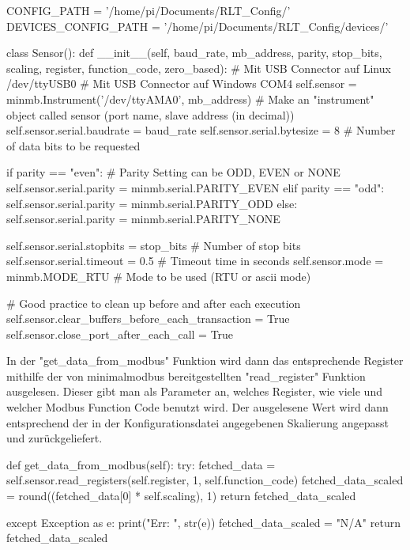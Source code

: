 \begin{pythoncode}
CONFIG_PATH = '/home/pi/Documents/RLT_Config/'
DEVICES_CONFIG_PATH = '/home/pi/Documents/RLT_Config/devices/'

class Sensor():
	def __init__(self, baud_rate, mb_address, parity, stop_bits, scaling, register, function_code, zero_based):
		# Mit USB Connector auf Linux       /dev/ttyUSB0
		# Mit USB Connector auf Windows     COM4
		self.sensor = minmb.Instrument('/dev/ttyAMA0',
		mb_address)  # Make an "instrument" object called sensor (port name, slave address (in decimal))
		self.sensor.serial.baudrate = baud_rate
		self.sensor.serial.bytesize = 8  # Number of data bits to be requested
		
		if parity == "even":  # Parity Setting can be ODD, EVEN or NONE
			self.sensor.serial.parity = minmb.serial.PARITY_EVEN
		elif parity == "odd":
			self.sensor.serial.parity = minmb.serial.PARITY_ODD
		else:
			self.sensor.serial.parity = minmb.serial.PARITY_NONE
		
		self.sensor.serial.stopbits = stop_bits  # Number of stop bits
		self.sensor.serial.timeout = 0.5  # Timeout time in seconds
		self.sensor.mode = minmb.MODE_RTU  # Mode to be used (RTU or ascii mode)
		
		# Good practice to clean up before and after each execution
		self.sensor.clear_buffers_before_each_transaction = True
		self.sensor.close_port_after_each_call = True
\end{pythoncode}

In der "get_data_from_modbus" Funktion wird dann das entsprechende Register mithilfe der von minimalmodbus bereitgestellten "read_register" Funktion ausgelesen. Dieser gibt man als Parameter an, welches Register, wie viele und welcher Modbus Function Code benutzt wird. Der ausgelesene Wert wird dann entsprechend der in der Konfigurationsdatei angegebenen Skalierung angepasst und zurückgeliefert.

\begin{pythoncode}
	def get_data_from_modbus(self):
		try:
			fetched_data = self.sensor.read_registers(self.register, 1, self.function_code)			
			fetched_data_scaled = round((fetched_data[0] * self.scaling), 1)
			return fetched_data_scaled
		
		except Exception as e:
			print("Err: ", str(e))
			fetched_data_scaled = "N/A"
			return fetched_data_scaled
\end{pythoncode}



